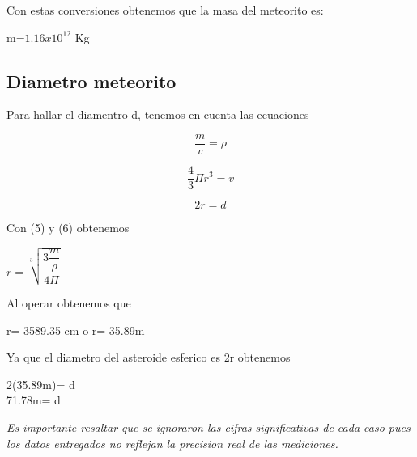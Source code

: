 \documentclass[12pt]{article}
\begin{document}
Con estas conversiones obtenemos que la masa del meteorito es:
\begin{center}
m=$1.16x10^{12}$ Kg
\end{center}

\subsection{Diametro meteorito}

Para hallar el diamentro d, tenemos en cuenta las ecuaciones

\begin{equation}\label{eq:5}
\dfrac{m}{v} = \rho
\end{equation}

\begin{equation}\label{eq:6}
\dfrac{4}{3}\Pi r^3 = v
\end{equation}

\begin{equation}\label{eq:7}
 2r=d
\end{equation}

Con (5) y (6) obtenemos

\begin{center}
$ r=\sqrt[3]{\dfrac{3\dfrac{m}{\rho}}{4\Pi}} $
\end{center}

Al operar obtenemos que \\

\begin{center}
r= 3589.35 cm o r= 35.89m \\
\end{center}

Ya que el diametro del asteroide esferico es 2r obtenemos \\

\begin{center}
2(35.89m)= d \\


71.78m= d    \\

\end{center}


\begin{large}

 \textsl{Es importante resaltar que se ignoraron las cifras significativas de cada caso pues los datos entregados no reflejan la precision real de las mediciones.} 

\end{large}
\end{document}
